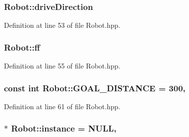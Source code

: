 \hypertarget{classRobot_af15d2eaa46a9736e5d3d3aa9e8a9751c}{
\subsubsection[{drive\-Direction}]{ Robot\-::drive\-Direction\hspace{0.3cm}{\ttfamily [private]}}}\label{classRobot_af15d2eaa46a9736e5d3d3aa9e8a9751c}


Definition at line 53 of file Robot.\-hpp.

\hypertarget{classRobot_a342f5f8be2b5641eb3ae8f9c8475ebe6}{
\subsubsection[{ff}]{ Robot\-::ff\hspace{0.3cm}{\ttfamily [private]}}}\label{classRobot_a342f5f8be2b5641eb3ae8f9c8475ebe6}


Definition at line 55 of file Robot.\-hpp.

\hypertarget{classRobot_afb4449356b3a3f92b2c76c612e8951ee}{
\subsubsection[{G\-O\-A\-L\-\_\-\-D\-I\-S\-T\-A\-N\-C\-E}]{\setlength{\rightskip}{0pt plus 5cm}const int Robot\-::\-G\-O\-A\-L\-\_\-\-D\-I\-S\-T\-A\-N\-C\-E = 300\hspace{0.3cm}{\ttfamily [static]}, {\ttfamily [private]}}}\label{classRobot_afb4449356b3a3f92b2c76c612e8951ee}


Definition at line 61 of file Robot.\-hpp.

\hypertarget{classRobot_aad5c5d6db601aac62393d47ec9385fa3}{
\subsubsection[{instance}]{ $\ast$ Robot\-::instance = N\-U\-L\-L\hspace{0.3cm}{\ttfamily [static]}, {\ttfamily [private]}}}\label{classRobot_aad5c5d6db601aac62393d47ec9385fa3}


